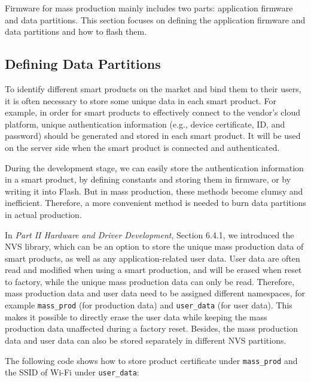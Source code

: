 \documentclass[a4paper,12pt]{book}
\begin{document}
Firmware for mass production mainly includes two parts: application firmware and data partitions. This section focuses on defining the application firmware and data partitions and how to flash them.

\subsection{Defining Data Partitions}

To identify different smart products on the market and bind them to their users, it is often necessary to store some unique data in each smart product. For example, in order for smart products to effectively connect to the vendor's cloud platform, unique authentication information (e.g., device certificate, ID, and password) should be generated and stored in each smart product. It will be used on the server side when the smart product is connected and authenticated.

During the development stage, we can easily store the authentication information in a smart product, by defining constants and storing them in firmware, or by writing it into Flash. But in mass production, these methods become clumsy and inefficient. Therefore, a more convenient method is needed to burn data partitions in actual production.

In \textit{Part II Hardware and Driver Development}, Section 6.4.1, we introduced the NVS library, which can be an option to store the unique mass production data of smart products, as well as any application-related user data. User data are often read and modified when using a smart production, and will be erased when reset to factory, while the unique mass production data can only be read. Therefore, mass production data and user data need to be assigned different namespaces, for example \texttt{mass\_prod} (for production data) and \texttt{user\_data} (for user data). This makes it possible to directly erase the user data while keeping the mass production data unaffected during a factory reset. Besides, the mass production data and user data can also be stored separately in different NVS partitions.

The following code shows how to store product certificate under \texttt{mass\_prod} and the SSID of Wi-Fi under \texttt{user\_data}:
\end{document}
